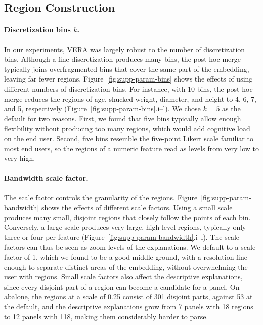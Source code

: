 \documentclass[10pt]{article}
\begin{document}
\subsection{Region Construction}

\paragraph{Discretization bins $k$.}
In our experiments, VERA was largely robust to the number of discretization bins.
Although a fine discretization produces many bins, the post hoc merge typically joins overfragmented bins that cover the same part of the embedding, leaving far fewer regions.
Figure~\ref{fig:supp-param-bins} shows the effects of using different numbers of discretization bins.
For instance, with 10 bins, the post hoc merge reduces the regions of age, shucked weight, diameter, and height to 4, 6, 7, and 5, respectively (Figure~\ref{fig:supp-param-bins}.i--l).
We chose $k=5$ as the default for two reasons.
First, we found that five bins typically allow enough flexibility without producing too many regions, which would add cognitive load on the end user.
Second, five bins resemble the five-point Likert scale familiar to most end users, so the regions of a numeric feature read as levels from very low to very high.

\paragraph{Bandwidth scale factor.}
The scale factor controls the granularity of the regions.
Figure~\ref{fig:supp-param-bandwidth} shows the effects of different scale factors.
Using a small scale produces many small, disjoint regions that closely follow the points of each bin.
Conversely, a large scale produces very large, high-level regions, typically only three or four per feature (Figure~\ref{fig:supp-param-bandwidth}.i--l).
The scale factors can thus be seen as zoom levels of the explanations.
We default to a scale factor of 1, which we found to be a good middle ground, with a resolution fine enough to separate distinct areas of the embedding, without overwhelming the user with regions.
Small scale factors also affect the descriptive explanations, since every disjoint part of a region can become a candidate for a panel.
On abalone, the regions at a scale of 0.25 consist of 301 disjoint parts, against 53 at the default, and the descriptive explanations grow from 7 panels with 18 regions to 12 panels with 118, making them considerably harder to parse.
\end{document}
